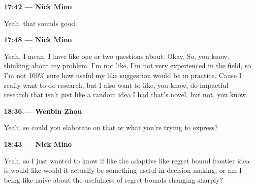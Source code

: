 \documentclass[11pt]{article}
\newcommand{\Turn}[2]{%
  \medskip\noindent\textbf{#1 --- #2}\par\nobreak\noindent\ignorespaces
}
\begin{document}
\Turn{17:42}{Nick Mino}
Yeah, that sounds good.

\Turn{17:48}{Nick Mino}
Yeah, I mean, I have like one or two questions about. Okay. So, you know,
thinking about my problem. I'm not like, I'm not very experienced in the field,
so I'm not 100\% sure how useful my like suggestion would be in practice. Cause
I really want to do research, but I also want to like, you know, do impactful
research that isn't just like a random idea I had that's novel, but not, you
know.

\Turn{18:36}{Wenbin Zhou}
Yeah, so could you elaborate on that or what you're trying to express?

\Turn{18:43}{Nick Mino}
Yeah, so I just wanted to know if like the adaptive like regret bound frontier
idea is would like would it actually be something useful in decision making, or
am I being like naive about the usefulness of regret bounds changing sharply?
\end{document}
